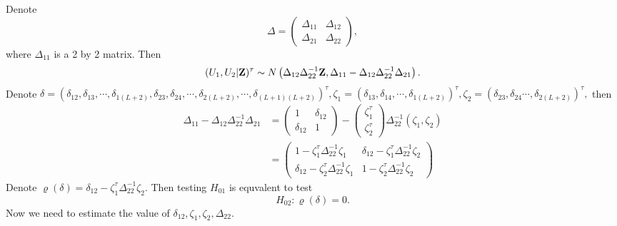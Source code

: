 \documentclass[a4,11pt,epsf, amssymb]{article}
\begin{document}
\begin{CJK}{GBK}{song}
Denote
$$\Delta=\left(\begin{array}{cc}\Delta_{11}&\Delta_{12}\\ \Delta_{21}&\Delta_{22}\end{array}\right),$$
where $\Delta_{11}$ is a 2 by 2 matrix. Then
$$(U_1,U_2|{\bf Z})^\tau \sim N \left(\Delta_{12}\Delta_{22}^{-1}{\bf Z}, \Delta_{11}-\Delta_{12}\Delta_{22}^{-1}\Delta_{21}\right).$$
Denote $\delta=(\delta_{12},\delta_{13},\cdots,\delta_{1(L+2)},\delta_{23},\delta_{24},\cdots,\delta_{2(L+2)},\cdots,\delta_{(L+1)(L+2)})^\tau,
\zeta_1 = (\delta_{13}, \delta_{14},\cdots, \delta_{1(L+2)})^{\tau}, \zeta_2 = (\delta_{23}, \delta_{24}\cdots, \delta_{2(L+2)})^{\tau},$ then
\begin{align*}
\Delta_{11}-\Delta_{12}\Delta_{22}^{-1}\Delta_{21} & = \left(\begin{array}{cc} 1 &\delta_{12}\\ \delta_{12}& 1\end{array}\right) - \left(\begin{array}{c} \zeta_1^\tau \\ \zeta_2^\tau \end{array} \right) \Delta_{22}^{-1} (\zeta_1,\zeta_2)\\
& = \left(\begin{array}{cc} 1 - \zeta_1^\tau \Delta_{22}^{-1} \zeta_1 & \delta_{12} - \zeta_1^\tau \Delta_{22}^{-1} \zeta_2 \\
\delta_{12} - \zeta_2^\tau \Delta_{22}^{-1} \zeta_1 & 1 - \zeta_2^\tau \Delta_{22}^{-1} \zeta_2 \end{array} \right)
\end{align*}
Denote $\varrho(\delta) = \delta_{12} - \zeta_1^\tau \Delta_{22}^{-1} \zeta_2$. Then testing $H_{01}$ is equvalent to test
$$H_{02}:\varrho(\delta) = 0.$$
Now we need to estimate the value of $\delta_{12},\zeta_1,\zeta_2,\Delta_{22}.$\\


\end{CJK}
\end{document}
